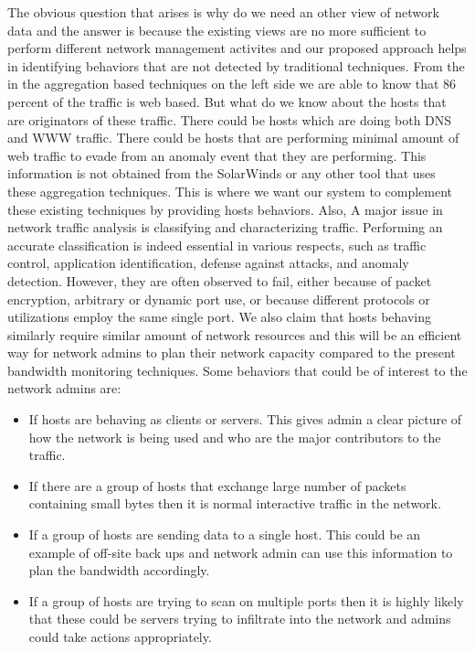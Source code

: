 The obvious question that arises is why do we need an other view of network data and the answer is because the existing views are no more sufficient to perform different network management activites and our proposed approach helps in identifying behaviors that are not detected by traditional techniques. From the  in the aggregation based techniques on the left side we are able to know that 86 percent of the traffic is web based. But what do we know about the hosts that are originators of these traffic. There could be hosts which are doing both DNS and WWW traffic. There could be hosts that are performing minimal amount of web traffic to evade from an anomaly event that they are performing. This information is not obtained from the SolarWinds or any other tool that uses these aggregation techniques. This is where we want our system to complement these existing techniques by providing hosts behaviors. Also, A major issue in network traffic analysis is classifying and characterizing traffic. Performing an accurate classification is indeed essential in various respects, such as traffic control, application identification, defense against attacks, and anomaly detection.
However, they are often observed to fail, either because of packet encryption, arbitrary or dynamic port use, or because different protocols or utilizations employ the same single port.
We also claim that hosts behaving similarly require similar amount of network resources and this will be an efficient way for network admins to plan their network capacity compared to the present bandwidth monitoring techniques. Some behaviors that could be of interest to the network admins are:


\begin{itemize}
	\item If hosts are behaving as clients or servers. This gives admin a clear picture of how the network is being used and who are the major contributors to the traffic.
	\item If there are a group of hosts that exchange large number of packets containing small bytes then it is normal interactive traffic in the network.	
	\item If a group of hosts are sending data to a single host. This could be an example of off-site back ups and network admin can use this information to plan the bandwidth accordingly.
	\item If a group of hosts are trying to scan on multiple ports then it is highly likely that these could be servers trying to infiltrate into the network and admins could take actions appropriately.
	
\end{itemize}


